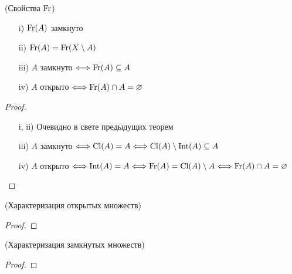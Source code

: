 \begin{theorem}(Свойства $\operatorname{Fr}$)
    \enewline
    \begin{itemize}
        \item[i)] $\operatorname{Fr}(A)$ замкнуто
        \item[ii)] $\operatorname{Fr}(A) = \operatorname{Fr}(X \setminus A)$
        \item[iii)] $A$ замкнуто $\Longleftrightarrow \operatorname{Fr}(A) \subseteq A$
        \item[iv)] $A$ открыто $\Longleftrightarrow \operatorname{Fr}(A) \cap A = \varnothing$
    \end{itemize}
\end{theorem}
\begin{proof}
    \enewline
    \begin{itemize}
        \item[i, ii)] Очевидно в свете предыдущих теорем
        \item[iii)] $A$ замкнуто $\Longleftrightarrow \operatorname{Cl}(A) = A \Longleftrightarrow \operatorname{Cl}(A) \setminus \operatorname{Int}(A)
        \subseteq A$
        \item[iv)] $A$ открыто $\Longleftrightarrow \operatorname{Int}(A) = A \Longleftrightarrow \operatorname{Fr}(A) = \operatorname{Cl}(A) \setminus
        A \Longleftrightarrow \operatorname{Fr}(A) \cap A = \varnothing$
    \end{itemize}
\end{proof}

\begin{theorem}(Характеризация открытых множеств)

\end{theorem}
\begin{proof}

\end{proof}

\begin{theorem}(Характеризация замкнутых множеств)

\end{theorem}
\begin{proof}

\end{proof}
